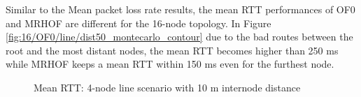 Similar to the Mean packet loss rate results, the mean RTT performances of OF0 and MRHOF are different for the 16-node topology. In Figure \ref{fig:16/OF0/line/dist50_montecarlo_contour} due to the bad routes between the root and the most distant nodes, the mean RTT becomes higher than 250 ms while MRHOF keeps a mean RTT within 150 ms even for the furthest node.
\newline

\begin{figure}[p]
  \centering
    \leavevmode
  \caption{Mean RTT: 4-node line scenario with 10 m internode distance}
 \label{fig:rtt_4_line_10}
\end{figure}

